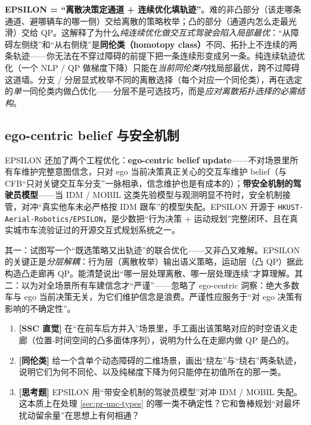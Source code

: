 \begin{insight}
\textbf{EPSILON = “离散决策定通道 + 连续优化填轨迹”}。难的非凸部分（该走哪条通道、避哪辆车的哪一侧）交给离散的策略枚举；凸的部分（通道内怎么走最光滑）交给 QP。这解释了为什么\emph{纯连续优化做交互式驾驶会陷入局部最优}：“从障碍左侧绕”和“从右侧绕”是\textbf{同伦类（homotopy class）}不同、拓扑上不连续的两条轨迹——你无法在不穿过障碍的前提下把一条连续形变成另一条。纯连续轨迹优化（一个 NLP / QP 做梯度下降）只能在\emph{当前同伦类内}找局部最优，跨不过障碍这道墙。分支 / 分层显式枚举不同的离散选择（每个对应一个同伦类），再在选定的\emph{单一}同伦类内做凸优化——分层不是可选技巧，而是\emph{应对离散拓扑选择的必需结构}。
\end{insight}

\subsection{ego-centric belief 与安全机制}
\label{sec:pr-epsilon-belief}

EPSILON 还加了两个工程优化\cite{ding2021epsilon}：\textbf{ego-centric belief update}——不对场景里所有车维护完整意图信念，只对 ego 当前决策真正关心的交互车维护 belief（与 CFB“只对关键交互车分支”一脉相承，信念维护也是有成本的）；\textbf{带安全机制的驾驶员模型}——当 IDM / MOBIL 这类先验模型与观测明显不符时，安全机制接管，对冲“真实他车未必严格按 IDM 跟车”的模型失配。EPSILON 开源于 \texttt{HKUST-Aerial-Robotics/\allowbreak EPSILON}，是少数把“行为决策 + 运动规划”完整闭环、且在真实城市车流验证过的开源交互式规划系统之一。

\begin{pitfall}
其一：试图写一个“既选策略又出轨迹”的联合优化——又非凸又难解。EPSILON 的关键正是\emph{分层解耦}：行为层（离散枚举）输出语义策略，运动层（凸 QP）据此构造凸走廊再 QP。能清楚说出“哪一层处理离散、哪一层处理连续”才算理解。其二：以为对全场景所有车建信念才“严谨”——忽略了 ego-centric 洞察：绝大多数车与 ego 当前决策无关，为它们维护信念是浪费。严谨性应服务于“对 ego 决策有影响的不确定性”。
\end{pitfall}

\begin{practice}
\begin{enumerate}
  \item \textbf{[SSC 直觉]} 在“在前车后方并入”场景里，手工画出该策略对应的时空语义走廊（位置-时间空间的凸多面体序列），说明为什么在走廊内做 QP 是凸的。
  \item \textbf{[同伦类]} 给一个含单个动态障碍的二维场景，画出“绕左”与“绕右”两条轨迹，说明它们为何不同伦、以及纯梯度下降为何只能停在初值所在的那一类。
  \item \textbf{[思考题]} EPSILON 用“带安全机制的驾驶员模型”对冲 IDM / MOBIL 失配。这本质上在处理 \cref{sec:pr-unc-types} 的哪一类不确定性？它和鲁棒规划“对最坏扰动留余量”在思想上有何相通？
\end{enumerate}
\end{practice}

